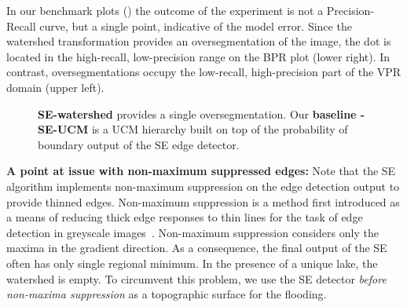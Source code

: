 In our benchmark plots () the outcome of the experiment is not a Precision-Recall curve, but a single point, %
indicative of the model error. Since the watershed transformation provides an oversegmentation of the image, the dot is located in the high-recall, low-precision range on the BPR plot (lower right). In contrast, oversegmentations occupy the low-recall, high-precision part of the VPR domain (upper left). 

\begin{figure}[ht!]
\centering
\caption[SE-watershed and baseline: SE-UCM plots]{{\bf SE-watershed} provides a single oversegmentation. Our {\bf baseline - SE-UCM} is a UCM hierarchy built on top of the probability of boundary output of the SE edge detector.}
\label{fig:SE-watershed}
\end{figure}

\textbf{A point at issue %
with non-maximum suppressed edges:} Note that the SE algorithm implements non-maximum suppression on the edge detection output to provide thinned edges. Non-maximum suppression is a method first introduced as a means of reducing thick edge responses to thin lines for the task of edge detection in greyscale images~\cite{rosenfeld1976digital}. Non-maximum suppression considers only the maxima in the gradient direction. As a consequence, the final output of the SE often has only single regional minimum. In the presence of a unique lake, the watershed is empty. To circumvent this problem, we use the SE detector \textit{before non-maxima suppression} as a topographic surface for the flooding.


